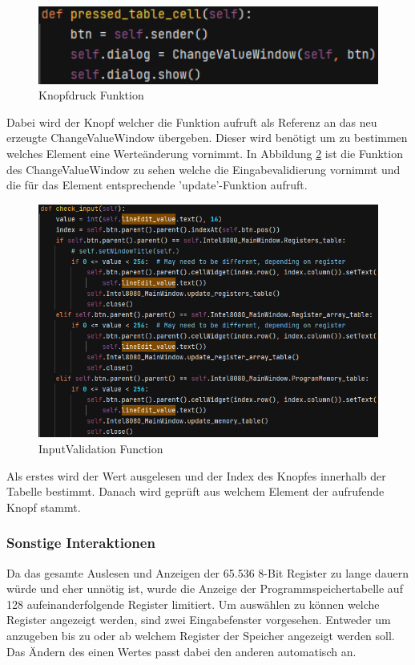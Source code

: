 \documentclass[12pt]{article}
\newcommand{\imgSpaceBefore}{\vspace{10pt}}
\begin{document}
\begin{figure}[H]
\centering
\includegraphics[width=12cm]{bilder/PTC}
\caption{Knopfdruck Funktion}
\label{fig:PTC}
\end{figure}

\noindent
Dabei wird der Knopf welcher die Funktion aufruft als Referenz an das neu erzeugte ChangeValueWindow übergeben. Dieser wird benötigt um zu bestimmen welches Element eine Werteänderung vornimmt. In Abbildung \ref{fig:CheckInput} ist die Funktion des ChangeValueWindow zu sehen welche die Eingabevalidierung vornimmt und die für das Element entsprechende 'update'-Funktion aufruft.\imgSpaceBefore

\begin{figure}[H]
\centering
\includegraphics[width=12cm]{bilder/CheckInput}
\caption{InputValidation Function}
\label{fig:CheckInput}
\end{figure}

\noindent
Als erstes wird der Wert ausgelesen und der Index des Knopfes innerhalb der Tabelle bestimmt. Danach wird geprüft aus welchem Element der aufrufende Knopf stammt.

\subsubsection{Sonstige Interaktionen}
Da das gesamte Auslesen und Anzeigen der 65.536 8-Bit Register zu lange dauern würde und eher unnötig ist, wurde die Anzeige der Programmspeichertabelle auf 128 aufeinanderfolgende Register limitiert. Um auswählen zu können welche Register angezeigt werden, sind zwei Eingabefenster vorgesehen. Entweder um anzugeben bis zu oder ab welchem Register der Speicher angezeigt werden soll. Das Ändern des einen Wertes passt dabei den anderen automatisch an.\imgSpaceBefore
\end{document}
